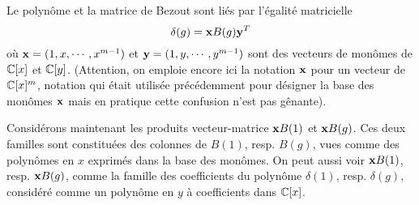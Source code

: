 \documentclass{standalone}
\begin{document}
\begin{rem}
Le polynôme et la matrice de Bezout sont liés par l'égalité matricielle
\begin{equation}
	\delta(g) = \bold{x} B(g) \bold{y}^T
\end{equation}
où $\bold{x} = (1, x,\cdots, x^{m-1})$ et $\bold{y} = (1, y,\cdots, y^{m-1})$ sont des vecteurs de monômes de $\mathbb{C}[x]$ et $\mathbb{C}[y]$. (Attention, on emploie encore ici la notation ${\bold x}$ pour un vecteur de $\mathbb{C}[x]^m$, notation qui était utilisée précédemment pour désigner la base des monômes ${\bold x}$ mais en pratique cette confusion n'est pas gênante).
\end{rem}
Considérons maintenant les produits vecteur-matrice $\bold{x}B(1)$ et $\bold{x}B(g)$. Ces deux familles sont constituées des colonnes de $B(1)$, resp. $B(g)$, vues comme des polynômes en $x$ exprimés dans la base des monômes. On peut aussi voir $\bold{x}B(1)$, resp. $\bold{x}B(g)$, comme la famille des coefficients du polynôme $\delta(1)$, resp. $\delta(g)$, considéré comme un polynôme en $y$ à coefficients dans $\mathbb{C}[x]$.
\end{document}
